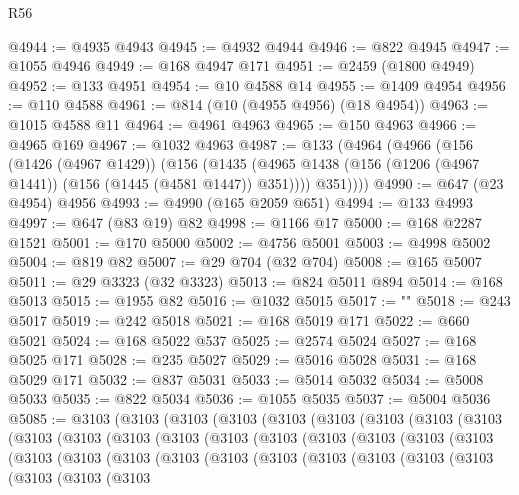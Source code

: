 \begin{lexlean}{R56}
\begin{coremodule}
@4944 := @4935 @4943
@4945 := @4932 @4944
@4946 := @822 @4945
@4947 := @1055 @4946
@4949 := @168 @4947 @171
@4951 := @2459 (@1800 @4949)
@4952 := @133 @4951
@4954 := @10 @4588 @14
@4955 := @1409 @4954
@4956 := @110 @4588
@4961 := @814 (@10 (@4955 @4956) (@18 @4954))
@4963 := @1015 @4588 @11
@4964 := @4961 @4963
@4965 := @150 @4963
@4966 := @4965 @169
@4967 := @1032 @4963
@4987 := @133
    (@4964
      (@4966
        (@156
          (@1426 (@4967 @1429))
          (@156
            (@1435 (@4965 @1438 (@156 (@1206 (@4967 @1441)) (@156 (@1445 (@4581 @1447)) @351))))
            @351))))
@4990 := @647 (@23 @4954) @4956
@4993 := @4990 (@165 @2059 @651)
@4994 := @133 @4993
@4997 := @647 (@83 @19) @82
@4998 := @1166 @17
@5000 := @168 @2287 @1521
@5001 := @170 @5000
@5002 := @4756 @5001
@5003 := @4998 @5002
@5004 := @819 @82
@5007 := @29 @704 (@32 @704)
@5008 := @165 @5007
@5011 := @29 @3323 (@32 @3323)
@5013 := @824 @5011 @894
@5014 := @168 @5013
@5015 := @1955 @82
@5016 := @1032 @5015
@5017 := "\n"
@5018 := @243 @5017
@5019 := @242 @5018
@5021 := @168 @5019 @171
@5022 := @660 @5021
@5024 := @168 @5022 @537
@5025 := @2574 @5024
@5027 := @168 @5025 @171
@5028 := @235 @5027
@5029 := @5016 @5028
@5031 := @168 @5029 @171
@5032 := @837 @5031
@5033 := @5014 @5032
@5034 := @5008 @5033
@5035 := @822 @5034
@5036 := @1055 @5035
@5037 := @5004 @5036
@5085 := @3103
    (@3103
      (@3103
        (@3103
          (@3103
            (@3103
              (@3103
                (@3103
                  (@3103
                    (@3103
                      (@3103
                        (@3103
                          (@3103
                            (@3103
                              (@3103
                                (@3103
                                  (@3103
                                    (@3103
                                      (@3103
                                        (@3103
                                          (@3103
                                            (@3103
                                              (@3103
                                                (@3103
                                                  (@3103
                                                    (@3103
                                                      (@3103
                                                        (@3103
                                                          (@3103
                                                            (@3103
                                                              (@3103
                                                                (@3103

\end{coremodule}
\end{lexlean}
